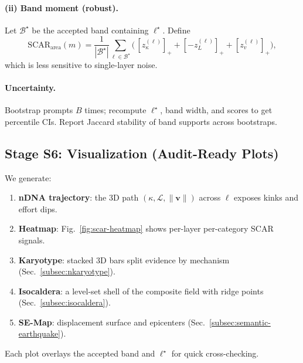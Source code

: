 \documentclass[11pt]{article}
\begin{document}
\paragraph{(ii) Band moment (robust).}
Let $\mathcal{B}^\star$ be the accepted band containing $\ell^\star$. Define
\[
\mathrm{SCAR}_{\text{area}}(m)=\frac{1}{|\mathcal{B}^\star|}\sum_{\ell\in\mathcal{B}^\star}\!\Big(\,[z_\kappa^{(\ell)}]_+ + [-z_L^{(\ell)}]_+ + [z_v^{(\ell)}]_+ \Big),
\]
which is less sensitive to single-layer noise.

\paragraph{Uncertainty.}
Bootstrap prompts $B$ times; recompute $\ell^\star$, band width, and scores to get percentile CIs. Report Jaccard stability of band supports across bootstraps.

\subsection{Stage S6: Visualization (Audit-Ready Plots)}
We generate:
\begin{enumerate}[leftmargin=1.7em,itemsep=3pt]
\item \textbf{nDNA trajectory}: the 3D path $(\kappa,\mathcal{L},\|\mathbf{v}\|)$ across $\ell$ exposes kinks and effort dips.
\item \textbf{Heatmap}: Fig.~\ref{fig:scar-heatmap} shows per-layer per-category SCAR signals.
\item \textbf{Karyotype}: stacked 3D bars split evidence by mechanism (Sec.~\ref{subsec:nkaryotype}).
\item \textbf{Isocaldera}: a level-set shell of the composite field with ridge points (Sec.~\ref{subsec:isocaldera}).
\item \textbf{SE-Map}: displacement surface and epicenters (Sec.~\ref{subsec:semantic-earthquake}).
\end{enumerate}
Each plot overlays the accepted band and $\ell^\star$ for quick cross-checking.
\end{document}
